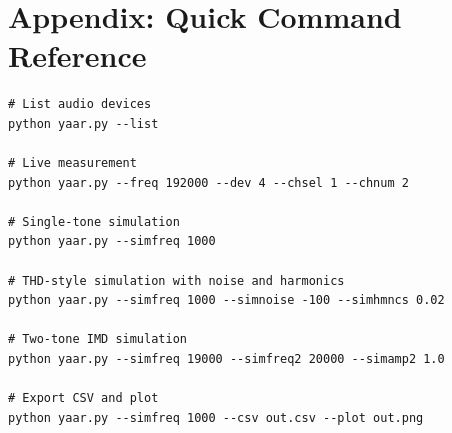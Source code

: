 \documentclass[conference]{IEEEtran}
\begin{document}
\section*{Appendix: Quick Command Reference}
\begin{lstlisting}[style=shellstyle]
# List audio devices
python yaar.py --list

# Live measurement
python yaar.py --freq 192000 --dev 4 --chsel 1 --chnum 2

# Single-tone simulation
python yaar.py --simfreq 1000

# THD-style simulation with noise and harmonics
python yaar.py --simfreq 1000 --simnoise -100 --simhmncs 0.02

# Two-tone IMD simulation
python yaar.py --simfreq 19000 --simfreq2 20000 --simamp2 1.0

# Export CSV and plot
python yaar.py --simfreq 1000 --csv out.csv --plot out.png
\end{lstlisting}
\end{document}
